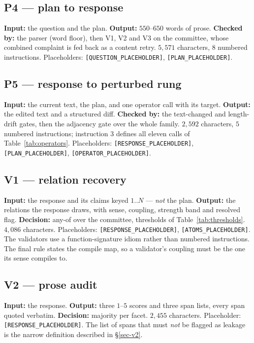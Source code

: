 \subsection{P4 --- plan to response}
\label{app-p4}
\textbf{Input:} the question and the plan. \textbf{Output:} $550$--$650$ words of prose. \textbf{Checked by:} the parser
(word floor), then V1, V2 and V3 on the committee, whose combined complaint is fed back as a content retry. $5{,}571$
characters, $8$ numbered instructions. Placeholders: \verb|[QUESTION_PLACEHOLDER]|, \verb|[PLAN_PLACEHOLDER]|.

\subsection{P5 --- response to perturbed rung}
\label{app-p5}
\textbf{Input:} the current text, the plan, and one operator call with its target. \textbf{Output:} the edited text and
a structured diff. \textbf{Checked by:} the text-changed and length-drift gates, then the adjacency gate over the whole
family. $2{,}592$ characters, $5$ numbered instructions; instruction 3 defines all eleven calls of
Table~\ref{tab:operators}. Placeholders: \verb|[RESPONSE_PLACEHOLDER]|, \verb|[PLAN_PLACEHOLDER]|,
\verb|[OPERATOR_PLACEHOLDER]|.

\subsection{V1 --- relation recovery}
\label{app-v1}
\textbf{Input:} the response and its claims keyed $1..N$ --- \emph{not} the plan. \textbf{Output:} the relations the
response draws, with sense, coupling, strength band and resolved flag. \textbf{Decision:} any-of over the committee,
thresholds of Table~\ref{tab:thresholds}. $4{,}086$ characters. Placeholders: \verb|[RESPONSE_PLACEHOLDER]|,
\verb|[ATOMS_PLACEHOLDER]|. The validators use a function-signature idiom rather than numbered instructions. The final
rule states the compile map, so a validator's coupling must be the one its sense compiles to.

\subsection{V2 --- prose audit}
\label{app-v2}
\textbf{Input:} the response. \textbf{Output:} three $1$--$5$ scores and three span lists, every span quoted verbatim.
\textbf{Decision:} majority per facet. $2{,}455$ characters. Placeholder: \verb|[RESPONSE_PLACEHOLDER]|. The list of spans
that must \emph{not} be flagged as leakage is the narrow definition described in \S\ref{sec-v2}.


